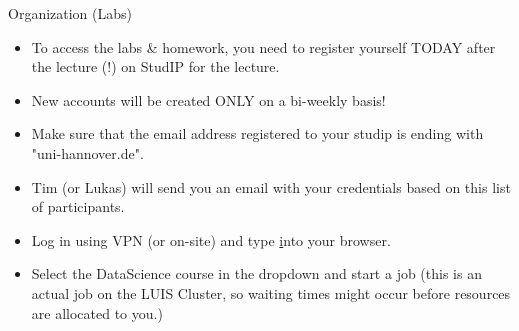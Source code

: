 \documentclass[aspectratio=169,handout]{../latex_main/tntbeamer}  %
\begin{document}
\begin{frame}[c]{Organization (Labs)}

\vspace{-1em}
\begin{itemize}
    \item To access the labs \& homework, you need to  \alert{register yourself TODAY after the lecture (!) on StudIP for the lecture}. 
    \item \alert{New accounts will be created ONLY on a bi-weekly basis!}
    \item Make sure that the email address registered to your studip is ending with "uni-hannover.de".
    \item Tim (or Lukas) will send you an email with your credentials based on this list of participants. 
    \item Log in using VPN (or on-site) and type  \href{https://jupyterhub.cluster.uni-hannover.de/} into your browser.
    \item Select the DataScience course in the dropdown and start a job 
    (this is an actual job on the LUIS Cluster, so waiting times might occur before resources are allocated to you.)
\end{itemize}

\end{frame}
\end{document}
